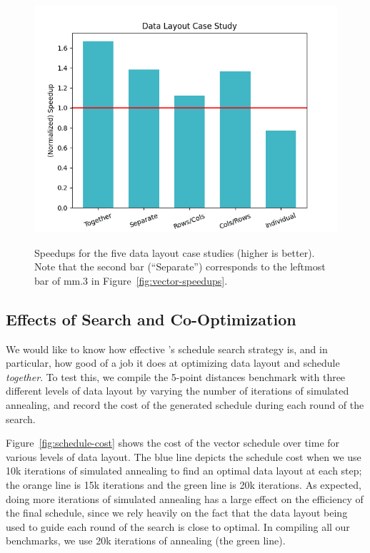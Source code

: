\begin{figure}
    \includegraphics[width=0.7\linewidth]{figures/graphs/case_study.png}
    \caption{Speedups for the five data layout case studies (higher is better). Note that the second bar (``Separate'') corresponds to the leftmost bar of {\sf mm.3} in Figure~\ref{fig:vector-speedups}.}
    \label{fig:data-layout-case-study}
\end{figure}


\subsection{Effects of Search and Co-Optimization}\label{sec:search-and-cooptimization}
We would like to know how effective \system's schedule search strategy is, and in particular, how good of a job it does at optimizing data layout and schedule {\em together}.
To test this, we compile the 5-point distances benchmark with three different levels of data layout by varying the number of iterations of simulated annealing, and record the cost of the generated schedule during each round of the search.

Figure~\ref{fig:schedule-cost} shows the cost of the vector schedule over time for various levels of data layout.
The blue line depicts the schedule cost when we use 10k iterations of simulated annealing to find an optimal data layout at each step; the orange line is 15k iterations and the green line is 20k iterations.
As expected, doing more iterations of simulated annealing has a large effect on the efficiency of the final schedule, since we rely heavily on the fact that the data layout being used to guide each round of the search is close to optimal.
In compiling all our benchmarks, we use 20k iterations of annealing (the green line).

